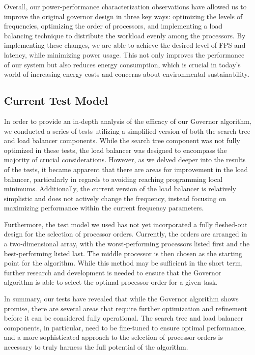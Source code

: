 \documentclass[a4paper, 12pt, fleqn]{article}
\begin{document}
Overall, our power-performance characterization observations have allowed us to improve the original governor design in three key ways: optimizing the levels of frequencies, optimizing the order of processors, and implementing a load balancing technique to distribute the workload evenly among the processors. By implementing these changes, we are able to achieve the desired level of FPS and latency, while minimizing power usage. This not only improves the performance of our system but also reduces energy consumption, which is crucial in today's world of increasing energy costs and concerns about environmental sustainability.


\subsection{Current Test Model}

In order to provide an in-depth analysis of the efficacy of our Governor algorithm, we conducted a series of tests utilizing a simplified version of both the search tree and load balancer components. While the search tree component was not fully optimized in these tests, the load balancer was designed to encompass the majority of crucial considerations. However, as we delved deeper into the results of the tests, it became apparent that there are areas for improvement in the load balancer, particularly in regards to avoiding reaching programming local minimums. Additionally, the current version of the load balancer is relatively simplistic and does not actively change the frequency, instead focusing on maximizing performance within the current frequency parameters.

Furthermore, the test model we used has not yet incorporated a fully fleshed-out design for the selection of processor orders. Currently, the orders are arranged in a two-dimensional array, with the worst-performing processors listed first and the best-performing listed last. The middle processor is then chosen as the starting point for the algorithm. While this method may be sufficient in the short term, further research and development is needed to ensure that the Governor algorithm is able to select the optimal processor order for a given task.

In summary, our tests have revealed that while the Governor algorithm shows promise, there are several areas that require further optimization and refinement before it can be considered fully operational. The search tree and load balancer components, in particular, need to be fine-tuned to ensure optimal performance, and a more sophisticated approach to the selection of processor orders is necessary to truly harness the full potential of the algorithm.
\end{document}
